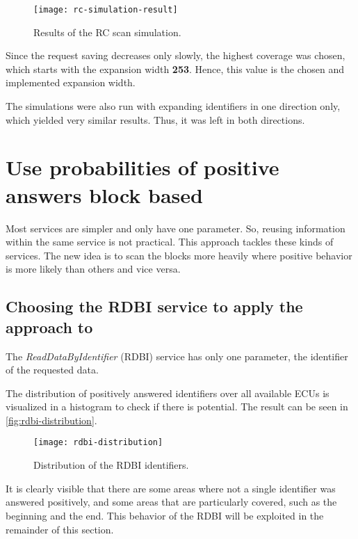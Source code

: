 \begin{figure}[htb]
    \centering
    \texttt{[image: rc-simulation-result]}
    \caption{Results of the RC scan simulation.}
    \label{fig:rc-simulation-result}
\end{figure}

Since the request saving decreases only slowly, the highest coverage was chosen, which starts with the expansion width \textbf{253}. Hence, this value is the chosen and implemented expansion width.

The simulations were also run with expanding identifiers in one direction only, which yielded very similar results. Thus, it was left in both directions.


\section{Use probabilities of positive answers block based}

Most services are simpler and only have one parameter. So, reusing information within the same service is not practical. This approach tackles these kinds of services. The new idea is to scan the blocks more heavily where positive behavior is more likely than others and vice versa.

\subsection{Choosing the RDBI service to apply the approach to}

The \emph{ReadDataByIdentifier} (RDBI) service has only one parameter, the identifier of the requested data.

The distribution of positively answered identifiers over all available ECUs is visualized in a histogram to check if there is potential. The result can be seen in \autoref{fig:rdbi-distribution}.

\begin{figure}[htb]
    \centering
    \texttt{[image: rdbi-distribution]}
    \caption{Distribution of the RDBI identifiers.}
    \label{fig:rdbi-distribution}
\end{figure}

It is clearly visible that there are some areas where not a single identifier was answered positively, and some areas that are particularly covered, such as the beginning and the end. This behavior of the RDBI will be exploited in the remainder of this section.

